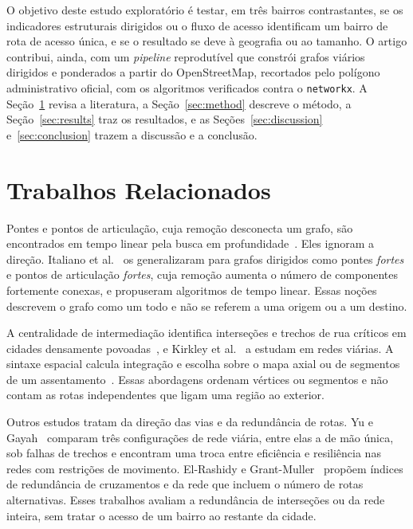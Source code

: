 O objetivo deste estudo exploratório é testar, em três bairros
contrastantes, se os indicadores estruturais dirigidos ou o fluxo de
acesso identificam um bairro de rota de acesso única, e se o resultado se
deve à geografia ou ao tamanho. O artigo contribui, ainda, com um
\emph{pipeline} reprodutível que constrói grafos viários dirigidos e
ponderados a partir do OpenStreetMap, recortados pelo polígono
administrativo oficial, com os algoritmos verificados contra o
\texttt{networkx}. A Seção~\ref{sec:related} revisa a literatura, a
Seção~\ref{sec:method} descreve o método, a Seção~\ref{sec:results} traz
os resultados, e as Seções~\ref{sec:discussion} e~\ref{sec:conclusion}
trazem a discussão e a conclusão.

\section{Trabalhos Relacionados}
\label{sec:related}

Pontes e pontos de articulação, cuja remoção desconecta um grafo, são
encontrados em tempo linear pela busca em profundidade~\cite{tarjan1972depth}.
Eles ignoram a direção. Italiano et al.~\cite{italiano2012finding} os
generalizaram para grafos dirigidos como pontes \emph{fortes} e pontos de
articulação \emph{fortes}, cuja remoção aumenta o número de componentes
fortemente conexas, e propuseram algoritmos de tempo linear. Essas
noções descrevem o grafo como um todo e não se referem a uma origem ou a
um destino.

A centralidade de intermediação identifica interseções e trechos de rua
críticos em cidades densamente povoadas~\cite{alatristasalas2019}, e
Kirkley et al.~\cite{kirkley2018betweenness} a estudam em redes viárias.
A sintaxe espacial calcula integração e escolha sobre o mapa axial ou de
segmentos de um assentamento~\cite{hillier1984social}. Essas abordagens
ordenam vértices ou segmentos e não contam as rotas independentes que
ligam uma região ao exterior.

Outros estudos tratam da direção das vias e da redundância de rotas. Yu e
Gayah~\cite{yu2020resilience} comparam três configurações de rede viária,
entre elas a de mão única, sob falhas de trechos e encontram uma troca
entre eficiência e resiliência nas redes com restrições de movimento.
El-Rashidy e Grant-Muller~\cite{elrashidy2016redundancy} propõem índices
de redundância de cruzamentos e da rede que incluem o número de rotas
alternativas. Esses trabalhos avaliam a redundância de interseções ou da
rede inteira, sem tratar o acesso de um bairro ao restante da cidade.

